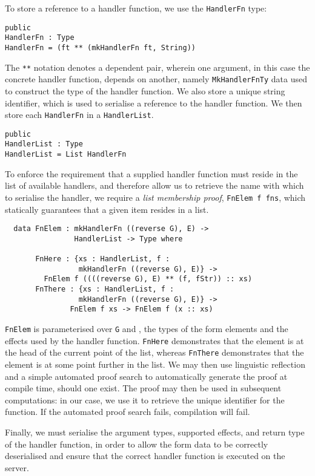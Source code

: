 \documentclass[preprint]{sigplanconf}
\begin{document}
To store a reference to a handler function, we use the \texttt{HandlerFn} type:
\begin{verbatim}
public
HandlerFn : Type
HandlerFn = (ft ** (mkHandlerFn ft, String))
\end{verbatim}
%
The \texttt{**} notation denotes a dependent pair, wherein one argument, in this case the concrete handler function, depends on another, namely \texttt{MkHandlerFnTy} data used to construct the type of the handler function. We also store a unique string identifier, which is used to serialise a reference to the handler function. We then store each \texttt{HandlerFn} in a \texttt{HandlerList}.

\begin{verbatim}
public
HandlerList : Type
HandlerList = List HandlerFn
\end{verbatim}
To enforce the requirement that a supplied handler function must reside in the list of available handlers, and therefore allow us to retrieve the name with which to serialise the handler, we require a \textit{list membership proof},  \texttt{FnElem f fns}, which statically guarantees that a given item resides in a list.
{\small
\begin{verbatim}
  data FnElem : mkHandlerFn ((reverse G), E) -> 
                HandlerList -> Type where
                
       FnHere : {xs : HandlerList, f : 
                 mkHandlerFn ((reverse G), E)} ->
         FnElem f ((((reverse G), E) ** (f, fStr)) :: xs)
       FnThere : {xs : HandlerList, f : 
                 mkHandlerFn ((reverse G), E)} ->
               FnElem f xs -> FnElem f (x :: xs)
\end{verbatim}
}
\texttt{FnElem} is parameterised over \texttt{G} and , the types of the form elements and the effects used by the handler function. \texttt{FnHere} demonstrates that the element is at the head of the current point of the list, whereas \texttt{FnThere} demonstrates that the element is at some point further in the list. %
We may then use linguistic reflection and a simple automated proof search to automatically generate the proof at compile time, should one exist. The proof may then be used in subsequent computations: in our case, we use it to retrieve the unique identifier for the function. If the automated proof search fails, compilation will fail.

Finally, we must serialise the argument types, supported effects, and return type of the handler function, in order to allow the form data to be correctly deserialised and ensure that the correct handler function is executed on the server. 
\end{document}
